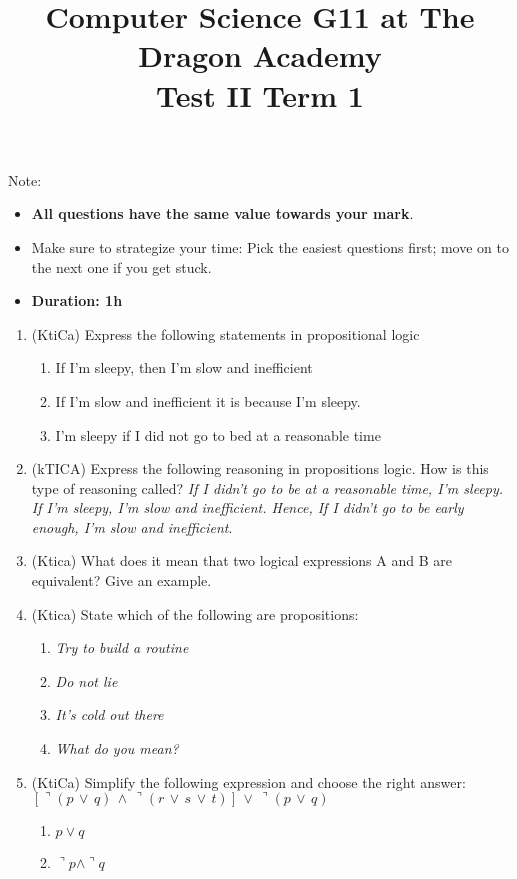 \documentclass{article}
\title{
Computer Science G11 at The Dragon Academy\\
Test II Term 1
}
\author{}
\begin{document}
\maketitle
Note:
\begin{itemize}
\item \textbf{All questions have the same value towards your mark}. 
\item Make sure to strategize your time: Pick the easiest questions first; move on to the next one if you get stuck.
\item \textbf{Duration: 1h}
\end{itemize}
\begin{enumerate}
\item (KtiCa) Express the following statements in propositional logic
\begin{enumerate}
\item If I'm sleepy, then I'm slow and inefficient
\item If I'm slow and inefficient it is because I'm sleepy.
\item I'm sleepy if I did not go to bed at a reasonable time
\end{enumerate}
\item (kTICA) Express the following reasoning in propositions logic. How is this type of reasoning called? \textit{If I didn't go to be at a reasonable time, I'm sleepy. If I'm sleepy, I'm slow and inefficient. Hence, If I didn't go to be early enough, I'm slow and inefficient}.
\item (Ktica) What does it mean that two logical expressions A and B are equivalent? Give an example.
\item (Ktica) State which of the following are propositions:
\begin{enumerate}
\item {\sl Try to build a routine}
\item {\sl Do not lie}
\item {\sl It's cold out there}
\item {\sl What do you mean?}
\end{enumerate}
\item (KtiCa) Simplify the following expression and choose the right answer: $\left[\urcorner \left(p\,\vee\,q\right)\,\wedge\,\urcorner\left(r\,\vee\,s\,\vee\,t\right)\right]\,\vee\,\urcorner\left(p\,\vee\,q\right)$
\begin{enumerate}
\item $p\vee q$
\item $\urcorner p \wedge \urcorner q$

\end{enumerate}
\end{enumerate}
\end{document}
